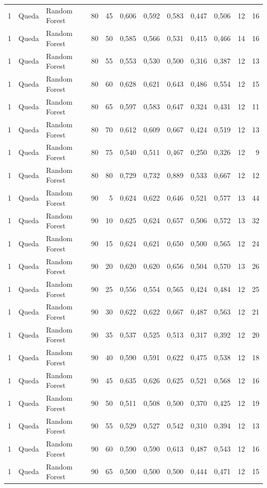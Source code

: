 \begin{longtable}{@{}rllrrrrrrrrr@{}}
1 & Queda & Random Forest & 80 & 45 & 0,606 & 0,592 & 0,583 & 0,447 & 0,506 & 12 & 16 \\
1 & Queda & Random Forest & 80 & 50 & 0,585 & 0,566 & 0,531 & 0,415 & 0,466 & 14 & 16 \\
1 & Queda & Random Forest & 80 & 55 & 0,553 & 0,530 & 0,500 & 0,316 & 0,387 & 12 & 13 \\
1 & Queda & Random Forest & 80 & 60 & 0,628 & 0,621 & 0,643 & 0,486 & 0,554 & 12 & 15 \\
1 & Queda & Random Forest & 80 & 65 & 0,597 & 0,583 & 0,647 & 0,324 & 0,431 & 12 & 11 \\
1 & Queda & Random Forest & 80 & 70 & 0,612 & 0,609 & 0,667 & 0,424 & 0,519 & 12 & 13 \\
1 & Queda & Random Forest & 80 & 75 & 0,540 & 0,511 & 0,467 & 0,250 & 0,326 & 12 & 9 \\
1 & Queda & Random Forest & 80 & 80 & 0,729 & 0,732 & 0,889 & 0,533 & 0,667 & 12 & 12 \\
1 & Queda & Random Forest & 90 & 5 & 0,624 & 0,622 & 0,646 & 0,521 & 0,577 & 13 & 44 \\
1 & Queda & Random Forest & 90 & 10 & 0,625 & 0,624 & 0,657 & 0,506 & 0,572 & 13 & 32 \\
1 & Queda & Random Forest & 90 & 15 & 0,624 & 0,621 & 0,650 & 0,500 & 0,565 & 12 & 24 \\
1 & Queda & Random Forest & 90 & 20 & 0,620 & 0,620 & 0,656 & 0,504 & 0,570 & 13 & 26 \\
1 & Queda & Random Forest & 90 & 25 & 0,556 & 0,554 & 0,565 & 0,424 & 0,484 & 12 & 25 \\
1 & Queda & Random Forest & 90 & 30 & 0,622 & 0,622 & 0,667 & 0,487 & 0,563 & 12 & 21 \\
1 & Queda & Random Forest & 90 & 35 & 0,537 & 0,525 & 0,513 & 0,317 & 0,392 & 12 & 20 \\
1 & Queda & Random Forest & 90 & 40 & 0,590 & 0,591 & 0,622 & 0,475 & 0,538 & 12 & 18 \\
1 & Queda & Random Forest & 90 & 45 & 0,635 & 0,626 & 0,625 & 0,521 & 0,568 & 12 & 16 \\
1 & Queda & Random Forest & 90 & 50 & 0,511 & 0,508 & 0,500 & 0,370 & 0,425 & 12 & 19 \\
1 & Queda & Random Forest & 90 & 55 & 0,529 & 0,527 & 0,542 & 0,310 & 0,394 & 12 & 13 \\
1 & Queda & Random Forest & 90 & 60 & 0,590 & 0,590 & 0,613 & 0,487 & 0,543 & 12 & 16 \\
1 & Queda & Random Forest & 90 & 65 & 0,500 & 0,500 & 0,500 & 0,444 & 0,471 & 12 & 15 \\

\end{longtable}
